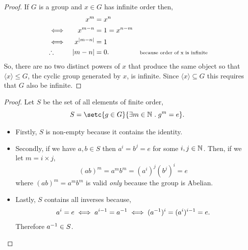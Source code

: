 \documentclass[MathsNotesBase.tex]{subfiles}
\begin{document}
{		
		\begin{proof}
			If $G$ is a group and ${ x \in G }$ has infinite order then,
			\begin{align*}
			&& x^m &= x^n \\
			&\iff & x^{m-n} &= 1= x^{n-m} &\text{\scriptsize{}} \\
			&\iff & x^{\left\lvert m-n\right\rvert} &= 1 &\text{\scriptsize{}} \\
			&\therefore & \left\lvert m-n\right\rvert &= 0. &\text{\scriptsize{because order of x is infinite}} \\
			\end{align*}
			So, there are no two distinct powers of $x$ that produce the same object so that ${ \langle x \rangle \leq G }$, the cyclic group generated by $x$, is infinite. Since ${ \langle x \rangle \subseteq G }$ this requires that $G$ also be infinite.
		\end{proof}
	
		\bigskip
	
		\bigskip
		\begin{proof}
			Let $S$ be the set of all elements of finite order,
			\[ S = \setc{g \in G}{\exists m \in \N{} \logicsep g^m = e}. \]
			\begin{itemize}
				\item{Firstly, $S$ is non-empty because it contains the identity.}
				\item{Secondly, if we have ${ a,b \in S }$ then ${ a^i = b^j = e }$ for some ${ i,j \in \mathbb{N}^{} }$. Then, if we let ${ m = i \times j }$,
					\[ (ab)^m = a^mb^m = (a^i)^j(b^j)^i = e \]
					where ${ (ab)^m = a^mb^m }$ is valid \textit{only} because the group is Abelian.
				}
				\item{Lastly, $S$ contains all inverses because,
					\[ a^i = e \iff a^{i-1} = {a}^{-1} \iff ({a}^{-1})^i = (a^i)^{i-1} = e. \]
					Therefore ${ {a}^{-1} \in S }$.
				}
			\end{itemize}		
		\end{proof}
	
}
\end{document}

